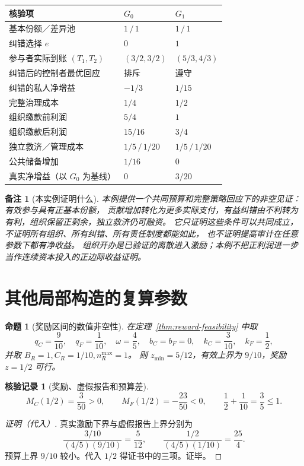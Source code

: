 \documentclass[12pt,a4paper,openany]{report}
\newtheorem{proposition}{命题}[chapter]
\newtheorem{remark}{备注}[chapter]
\newtheorem{Certificate}{核验记录}[chapter]
\begin{document}
\begin{CJK*}{UTF8}{gkai}
\begin{center}
\begin{tabular}{L{0.40\textwidth}L{0.23\textwidth}L{0.23\textwidth}}
\toprule 核验项 & $G_0$ & $G_1$ \\\midrule
基本份额／差异池 & $1\,/\,1$ & $1\,/\,1$\\
纠错选择 $e$ & $0$ & $1$\\
参与者实际到账 $(T_1,T_2)$ & $(3/2,3/2)$ & $(5/3,4/3)$\\
纠错后的控制者最优回应 & 排斥 & 遵守\\
纠错的私人净增益 & $-1/3$ & $1/15$\\
完整治理成本 & $1/4$ & $1/2$\\
组织缴款前利润 & $5/4$ & $1$\\
组织缴款后利润 & $15/16$ & $3/4$\\
独立救济／管理成本 & $1/5\,/\,1/20$ & $1/5\,/\,1/20$\\
公共储备增加 & $1/16$ & $0$\\
真实净增益（以 $G_0$ 为基线） & $0$ & $3/20$\\
\bottomrule
\end{tabular}
\end{center}

\begin{remark}[本实例证明什么]
本例提供一个共同预算和完整策略回应下的非空见证：有效参与具有正基本份额，
贡献增加转化为更多实际支付，有益纠错由不利转为有利，组织保留正剩余，独立救济仍可融资。
它只证明这些条件可以共同成立，不证明所有组织、所有纠错、所有责任制度都能如此，
也不证明提高审计在任意参数下都有净收益。
组织开办是已验证的离散进入激励；本例不把正利润进一步当作连续资本投入的正边际收益证明。
\end{remark}

\section{其他局部构造的复算参数}

\begin{proposition}[奖励区间的数值非空性]
\label{prop:reward-example}
在定理~\ref{thm:reward-feasibility} 中取
\[
 q_C=\frac9{10},\quad q_F=\frac1{10},\quad
 \omega=\frac45,\quad b_C=b_F=0,\quad
 k_C=\frac3{10},\quad k_F=\frac12,
\]
并取 $B_R=1,C_R=1/10,n_R^{\max}=1$。
则 $z_{\min}=5/12$，有效上界为 $9/10$，奖励 $z=1/2$ 可行。
\end{proposition}
\begin{Certificate}[奖励、虚假报告和预算差]
\[
 M_C(1/2)=\frac3{50}>0,\qquad
 M_F(1/2)=-\frac{23}{50}<0,\qquad
 \frac12+\frac1{10}=\frac35\le1.
\]
\end{Certificate}
\begin{proof}[证明（代入）]
真实激励下界与虚假报告上界分别为
\[
 \frac{3/10}{(4/5)(9/10)}=\frac5{12},\qquad
 \frac{1/2}{(4/5)(1/10)}=\frac{25}4.
\]
预算上界 $9/10$ 较小。代入 $1/2$ 得证书中的三项。证毕。
\end{proof}


\end{CJK*}
\end{document}
